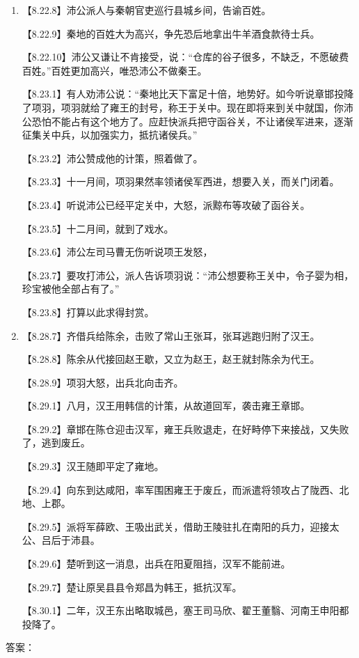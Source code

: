 \documentclass[fontset=none,11pt,a4paper]{ctexart}
\newcommand{\answerline}[1]{\underline{\hspace{#1}}}
\begin{document}
\begin{enumerate}[label=\Alph*.]
\noindent 【8.11.8】沛公回军亢父，到了方与，没有交战。\par
  \item
\noindent 【8.22.8】沛公派人与秦朝官吏巡行县城乡间，告谕百姓。\par
\noindent 【8.22.9】秦地的百姓大为高兴，争先恐后地拿出牛羊酒食款待士兵。\par
\noindent 【8.22.10】沛公又谦让不肯接受，说：“仓库的谷子很多，不缺乏，不愿破费百姓。”百姓更加高兴，唯恐沛公不做秦王。\par
\noindent 【8.23.1】有人劝沛公说：“秦地比天下富足十倍，地势好。如今听说章邯投降了项羽，项羽就给了雍王的封号，称王于关中。现在即将来到关中就国，你沛公恐怕不能占有这个地方了。应赶快派兵把守函谷关，不让诸侯军进来，逐渐征集关中兵，以加强实力，抵抗诸侯兵。”\par
\noindent 【8.23.2】沛公赞成他的计策，照着做了。\par
\noindent 【8.23.3】十一月间，项羽果然率领诸侯军西进，想要入关，而关门闭着。\par
\noindent 【8.23.4】听说沛公已经平定关中，大怒，派黥布等攻破了函谷关。\par
\noindent 【8.23.5】十二月间，就到了戏水。\par
\noindent 【8.23.6】沛公左司马曹无伤听说项王发怒，\par
\noindent 【8.23.7】要攻打沛公，派人告诉项羽说：“沛公想要称王关中，令子婴为相，珍宝被他全部占有了。”\par
\noindent 【8.23.8】打算以此求得封赏。\par
  \item
\noindent 【8.28.7】齐借兵给陈余，击败了常山王张耳，张耳逃跑归附了汉王。\par
\noindent 【8.28.8】陈余从代接回赵王歇，又立为赵王，赵王就封陈余为代王。\par
\noindent 【8.28.9】项羽大怒，出兵北向击齐。\par
\noindent 【8.29.1】八月，汉王用韩信的计策，从故道回军，袭击雍王章邯。\par
\noindent 【8.29.2】章邯在陈仓迎击汉军，雍王兵败退走，在好畤停下来接战，又失败了，逃到废丘。\par
\noindent 【8.29.3】汉王随即平定了雍地。\par
\noindent 【8.29.4】向东到达咸阳，率军围困雍王于废丘，而派遣将领攻占了陇西、北地、上郡。\par
\noindent 【8.29.5】派将军薛欧、王吸出武关，借助王陵驻扎在南阳的兵力，迎接太公、吕后于沛县。\par
\noindent 【8.29.6】楚听到这一消息，出兵在阳夏阻挡，汉军不能前进。\par
\noindent 【8.29.7】楚让原吴县县令郑昌为韩王，抵抗汉军。\par
\noindent 【8.30.1】二年，汉王东出略取城邑，塞王司马欣、翟王董翳、河南王申阳都投降了。\par
\end{enumerate}
答案：\answerline{2.2cm}
\end{document}
